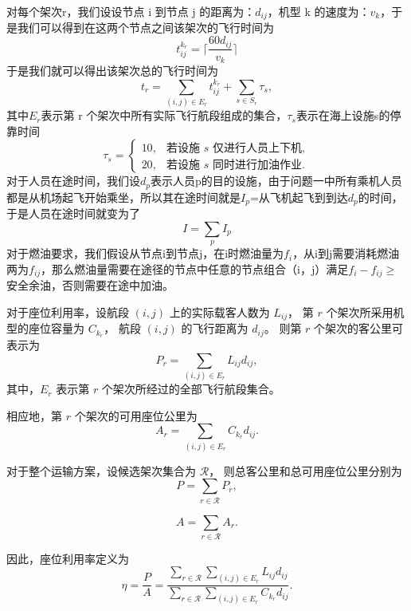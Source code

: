\documentclass[UTF-8,a4paper,zihao=-4]{ctexart}
\begin{document}
对每个架次r，我们设设节点 i 到节点 j 的距离为：$d_{ij}$，机型 k 的速度为：$v_k$，于是我们可以得到在这两个节点之间该架次的飞行时间为\begin{equation}t_{ij}^{k_r}=\lceil\frac{60d_{ij}}{v_k}\rceil\end{equation}
于是我们就可以得出该架次总的飞行时间为
\begin{equation}
t_r
=
\sum_{(i,j)\in E_r} t_{ij}^{k_r}
+
\sum_{s\in S_r} \tau_s ,
\end{equation}
其中$E_r$表示第 r 个架次中所有实际飞行航段组成的集合，$\tau_s$表示在海上设施s的停靠时间
\begin{equation}
\tau_s=
\begin{cases}
10, & \text{若设施 $s$ 仅进行人员上下机},\\
20, & \text{若设施 $s$ 同时进行加油作业}.
\end{cases}
\end{equation}
对于人员在途时间，我们设$d_p$表示人员p的目的设施，由于问题一中所有乘机人员都是从机场起飞开始乘坐，所以其在途时间就是$I_p$=从飞机起飞到到达$d_p$的时间，于是人员在途时间就变为了
\begin{equation}
    I=\sum_{p}I_p
\end{equation}
对于燃油要求，我们假设从节点i到节点j，在i时燃油量为$f_i$，从i到j需要消耗燃油两为$f_{ij}$，那么燃油量需要在途径的节点中任意的节点组合（i，j）满足$f_i-f_{ij}\geq$安全余油，否则需要在途中加油。

对于座位利用率，设航段 $(i,j)$ 上的实际载客人数为 $L_{ij}$，
第 $r$ 个架次所采用机型的座位容量为 $C_{k_r}$，
航段 $(i,j)$ 的飞行距离为 $d_{ij}$。
则第 $r$ 个架次的客公里可表示为
\begin{equation}
P_r
=
\sum_{(i,j)\in E_r}
L_{ij}d_{ij},
\end{equation}
其中，$E_r$ 表示第 $r$ 个架次所经过的全部飞行航段集合。

相应地，第 $r$ 个架次的可用座位公里为
\begin{equation}
A_r
=
\sum_{(i,j)\in E_r}
C_{k_r}d_{ij}.
\end{equation}

对于整个运输方案，设候选架次集合为 $\mathcal{R}$，
则总客公里和总可用座位公里分别为
\begin{equation}
P
=
\sum_{r\in\mathcal{R}} P_r,
\end{equation}

\begin{equation}
A
=
\sum_{r\in\mathcal{R}} A_r.
\end{equation}

因此，座位利用率定义为
\begin{equation}
\eta
=
\frac{P}{A}
=
\frac{
\displaystyle
\sum_{r\in\mathcal{R}}
\sum_{(i,j)\in E_r}
L_{ij}d_{ij}
}{
\displaystyle
\sum_{r\in\mathcal{R}}
\sum_{(i,j)\in E_r}
C_{k_r}d_{ij}
}.
\end{equation}
\end{document}
